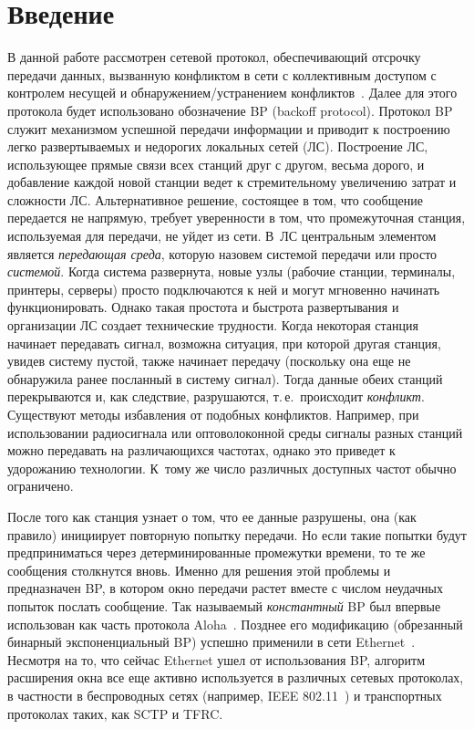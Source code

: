       \begin{multicols}{2}

      \label{st\stat}
      
            
\section{Введение}

В данной работе  рассмотрен  сетевой прото\-кол, обес\-пе\-чи\-ва\-ющий
отсрочку передачи данных, %
вызванную конфликтом   в сети с
кол\-лек\-тивным доступом с контролем несущей и обнаружением/устранением
конфликтов~\cite{METCALFE}. Далее для этого протокола будет
использовано  обозначение BP (backoff protocol). Протокол BP служит
механизмом %
успешной передачи информации и приводит к по\-стро\-ению легко
развертываемых и недорогих локальных сетей (ЛС). По\-стро\-ение ЛС,
использующее прямые связи всех станций друг с другом, весьма дорого,
и добавление каждой  новой станции ведет к стремительному увеличению
затрат и сложности ЛС. Альтернативное решение, состоящее в том, что
сообщение передается не напрямую, требует  уверенности в том, что
промежуточная станция, используемая для передачи,  не уйдет из сети.
В~ЛС центральным элементом является  {\it передающая среда}, которую
назовем системой передачи или просто {\it системой}. Когда система
развернута, новые узлы (рабочие станции, терминалы, принтеры,
серверы) просто подключаются к ней и могут мгновенно начинать
функционировать.
   Однако такая простота и быстрота  развертывания и организации ЛС  создает технические
трудности. Когда некоторая станция начинает передавать сигнал,
возможна ситуация, при которой  другая станция, увидев систему
пус\-той, также  начинает  передачу (поскольку она еще не обнаружила
ранее посланный в систему сигнал). Тогда данные обеих станций
перекрываются и, как следствие, разрушаются, т.\,е.\ происходит {\it
конфликт}. Существуют методы избавления от подобных конфликтов.
Например, при использовании радиосигнала или оптоволоконной среды
сигналы  разных станций можно передавать на различающихся час\-то\-тах,
однако это приведет к удорожанию технологии. К~тому же число
различных доступных частот обычно ограничено.

После того как станция узнает о том, что ее данные разрушены, она
(как правило) инициирует повторную попытку передачи. Но если такие
попытки будут предприниматься  через детерминированные промежутки
времени, то  те же сообщения столкнутся вновь. Именно для решения
этой проб\-ле\-мы и предназначен BP, в котором окно передачи растет
вместе с числом неудачных попыток послать сообщение. Так называемый
{\it константный} BP был впервые использован как часть протокола
Aloha~\cite {ABRAMSON85}. Позднее его модификацию (обрезанный
бинарный экспоненциальный BP) успешно применили в сети Ethernet~\cite {METCALFE, SHOCH}. 
Несмотря на то, что сейчас Ethernet ушел от
использования BP, алгоритм расширения окна все еще активно
используется в различных сетевых протоколах, в частности в
беспроводных сетях (например, IEEE 802.11~\cite {IEEE80211}) и
транспортных протоколах таких, как SCTP и TFRC.


\end{multicols}
